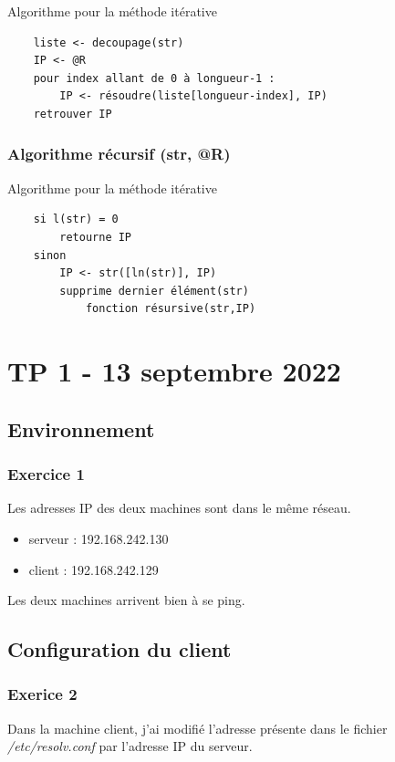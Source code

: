 \documentclass[12pt, a4paper]{article}
\begin{document}
    \begin{listing}[H]
        \caption{Algorithme pour la méthode itérative}
        \label{lst:ite}
        \begin{verbatim}
    liste <- decoupage(str)
    IP <- @R 
    pour index allant de 0 à longueur-1 :
        IP <- résoudre(liste[longueur-index], IP)
    retrouver IP
        \end{verbatim}
    \end{listing}

    \subsubsection{Algorithme récursif (str, @R)}

    \begin{listing}[H]
        \caption{Algorithme pour la méthode itérative}
        \label{lst:recu}
        \begin{verbatim}
    si l(str) = 0
        retourne IP
    sinon
        IP <- str([ln(str)], IP)
        supprime dernier élément(str)
            fonction résursive(str,IP)
        \end{verbatim}
    \end{listing}

\newpage
\section{TP 1 - 13 septembre 2022}
    \subsection{Environnement}
        \subsubsection{Exercice 1}
        Les adresses IP des deux machines sont dans le même réseau. 
        \begin{itemize}
            \item serveur : 192.168.242.130
            \item client : 192.168.242.129
        \end{itemize}
        Les deux machines arrivent bien à se ping.

    \subsection{Configuration du client}
        \subsubsection{Exerice 2}
        Dans la machine client, j'ai modifié l'adresse présente dans le fichier\\ 
        \textit{/etc/resolv.conf} par l'adresse IP du serveur.
\end{document}

